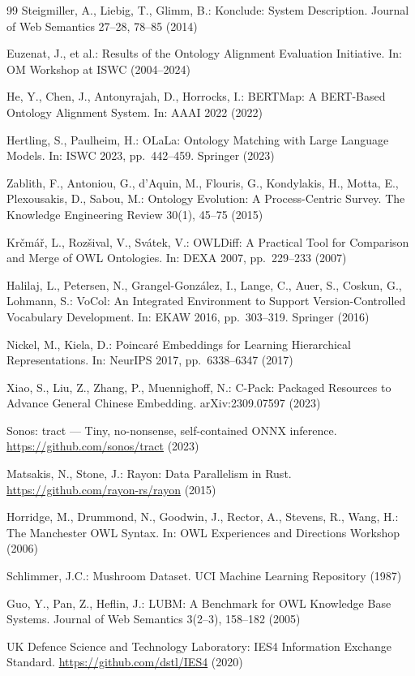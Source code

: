 \documentclass[runningheads]{llncs}
\begin{document}
\begin{thebibliography}{99}
Steigmiller, A., Liebig, T., Glimm, B.: Konclude: System Description. Journal of Web Semantics 27--28, 78--85 (2014)

Euzenat, J., et al.: Results of the Ontology Alignment Evaluation Initiative. In: OM Workshop at ISWC (2004--2024)

He, Y., Chen, J., Antonyrajah, D., Horrocks, I.: BERTMap: A BERT-Based Ontology Alignment System. In: AAAI 2022 (2022)

Hertling, S., Paulheim, H.: OLaLa: Ontology Matching with Large Language Models. In: ISWC 2023, pp.\ 442--459. Springer (2023)

Zablith, F., Antoniou, G., d'Aquin, M., Flouris, G., Kondylakis, H., Motta, E., Plexousakis, D., Sabou, M.: Ontology Evolution: A Process-Centric Survey. The Knowledge Engineering Review 30(1), 45--75 (2015)

Kr\v{c}m\'a\v{r}, L., Roz\v{s}ival, V., Sv\'atek, V.: OWLDiff: A Practical Tool for Comparison and Merge of OWL Ontologies. In: DEXA 2007, pp.\ 229--233 (2007)

Halilaj, L., Petersen, N., Grangel-Gonz\'alez, I., Lange, C., Auer, S., Coskun, G., Lohmann, S.: VoCol: An Integrated Environment to Support Version-Controlled Vocabulary Development. In: EKAW 2016, pp.\ 303--319. Springer (2016)

Nickel, M., Kiela, D.: Poincar\'e Embeddings for Learning Hierarchical Representations. In: NeurIPS 2017, pp.\ 6338--6347 (2017)

Xiao, S., Liu, Z., Zhang, P., Muennighoff, N.: C-Pack: Packaged Resources to Advance General Chinese Embedding. arXiv:2309.07597 (2023)

Sonos: tract --- Tiny, no-nonsense, self-contained ONNX inference. \url{https://github.com/sonos/tract} (2023)

Matsakis, N., Stone, J.: Rayon: Data Parallelism in Rust. \url{https://github.com/rayon-rs/rayon} (2015)

Horridge, M., Drummond, N., Goodwin, J., Rector, A., Stevens, R., Wang, H.: The Manchester OWL Syntax. In: OWL Experiences and Directions Workshop (2006)

Schlimmer, J.C.: Mushroom Dataset. UCI Machine Learning Repository (1987)

Guo, Y., Pan, Z., Heflin, J.: LUBM: A Benchmark for OWL Knowledge Base Systems. Journal of Web Semantics 3(2--3), 158--182 (2005)

UK Defence Science and Technology Laboratory: IES4 Information Exchange Standard. \url{https://github.com/dstl/IES4} (2020)

\end{thebibliography}
\end{document}
